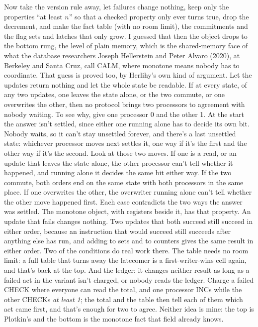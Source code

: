 \documentclass[11pt,twoside]{article}
\theoremstyle{thielethm}
\theoremstyle{thieledef}
\theoremstyle{thieledef}
\theoremstyle{thieledef}
\theoremstyle{thielethm}
\theoremstyle{thieleobs}
\theoremstyle{thielethm}
\begin{document}
Now take the version rule away, let failures change nothing, keep only the properties ``at least
$n$'' so that a checked property only ever turns true, drop the decrement, and make the fact
table (with no room limit), the commitments and the flag sets and latches that only grow. I guessed that then the
object drops to the bottom rung, the level of plain memory, which is the shared-memory face of
what the database researchers Joseph Hellerstein and Peter Alvaro (2020), at Berkeley and Santa
Cruz, call CALM, where monotone means nobody has to coordinate. That guess is proved too, by Herlihy's
own kind of argument. Let the updates return nothing and let the whole state be readable. If at
every state, of any two updates, one leaves the state alone, or the two commute, or one
overwrites the other, then no protocol brings two processors to agreement with nobody waiting.
To see why, give one processor 0 and the other 1. At the start the answer isn't settled, since
either one running alone has to decide its own bit. Nobody waits, so it can't stay unsettled
forever, and there's a last unsettled state: whichever processor moves next settles it, one way
if it's the first and the other way if it's the second. Look at those two moves. If one is a read,
or an update that leaves the state alone, the other processor can't tell whether it happened, and
running alone it decides the same bit either way. If the two commute, both orders end on the same
state with both processors in the same place. If one overwrites the other, the overwriter running
alone can't tell whether the other move happened first. Each case contradicts the two ways the
answer was settled. The monotone object, with registers beside it, has that property. An update
that fails changes nothing. Two updates that both succeed still succeed in either order, because
an instruction that would succeed still succeeds after anything else has run, and adding to sets
and to counters gives the same result in either order. Two of the conditions do real work there.
The table needs no room limit: a full table that turns away the latecomer is a first-writer-wins
cell again, and that's back at the top. And the ledger: it changes neither result as long as a
failed act in the variant isn't charged, or nobody reads the ledger. Charge a failed CHECK where
everyone can read the total, and one processor INCs while the other CHECKs \emph{at least 1};
the total and the table then tell each of them which act came first, and that's enough for two to
agree. Neither idea is mine: the top is Plotkin's and the bottom is the monotone
fact that field already knows.
\end{document}
